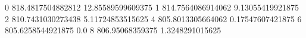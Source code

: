 0 818.4817504882812 12.85589599609375
1 814.7564086914062 9.13055419921875
2 810.7431030273438 5.11724853515625
4 805.8013305664062 0.17547607421875
6 805.6258544921875 0.0
8 806.95068359375 1.3248291015625
